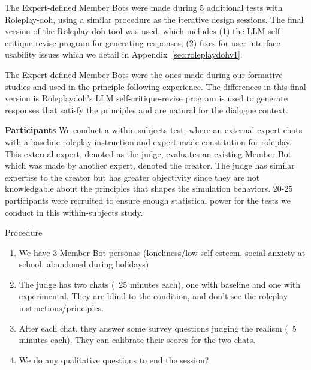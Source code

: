  The Expert-defined Member Bots were made during 5 additional tests with Roleplay-doh, using a similar procedure as the iterative design sessions. The final version of the Roleplay-doh tool was used, which includes (1) the LLM self-critique-revise program for generating responses; (2) fixes for user interface usability issues which we detail in Appendix~\ref{sec:roleplaydohv1}. 

 The Expert-defined Member Bots were the ones made during our formative studies and used in the principle following experience.  The differences in this final version is Roleplaydoh's LLM self-critique-revise program is used to generate responses that satisfy the principles and are natural for the dialogue context. 

\textbf{Participants} We conduct a within-subjects test, where an external expert chats with a baseline roleplay instruction and expert-made constitution for roleplay. This external expert, denoted as the judge, evaluates an existing Member Bot which was made by another expert, denoted the creator. The judge has similar expertise to the creator but has greater objectivity since they are not knowledgable about the principles that shapes the simulation behaviors. 20-25 participants were recruited to ensure enough statistical power for the tests we conduct in this within-subjects study.


Procedure
\begin{enumerate}
    \item We have 3 Member Bot personas (loneliness/low self-esteem, social anxiety at school, abandoned during holidays)  
    \item The judge has two chats (~25 minutes each), one with baseline and one with experimental.  They are blind to the condition, and don't see the roleplay instructions/principles.
    \item After each chat, they answer some survey questions judging the realism (~5 minutes each).  They can calibrate their scores for the two chats.
    \item We do any qualitative questions to end the session? 
\end{enumerate}

